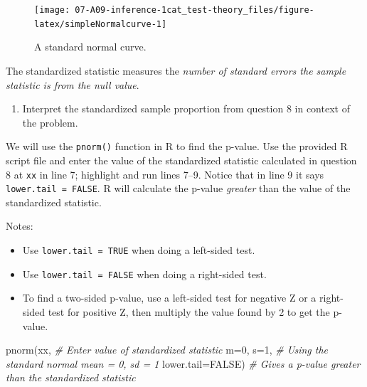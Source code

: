 \documentclass[
]{report}
\newenvironment{Shaded}{\begin{snugshade}}{\end{snugshade}}
\newcommand{\AttributeTok}[1]{\textcolor[rgb]{0.77,0.63,0.00}{#1}}
\newcommand{\CommentTok}[1]{\textcolor[rgb]{0.56,0.35,0.01}{\textit{#1}}}
\newcommand{\ConstantTok}[1]{\textcolor[rgb]{0.00,0.00,0.00}{#1}}
\newcommand{\DecValTok}[1]{\textcolor[rgb]{0.00,0.00,0.81}{#1}}
\newcommand{\FunctionTok}[1]{\textcolor[rgb]{0.00,0.00,0.00}{#1}}
\newcommand{\NormalTok}[1]{#1}
\providecommand{\tightlist}{%
  \setlength{\itemsep}{0pt}\setlength{\parskip}{0pt}}
\begin{document}
\begin{figure}

{\centering \texttt{[image: 07-A09-inference-1cat\_test-theory\_files/figure-latex/simpleNormalcurve-1]} 

}

\caption{A standard normal curve.}\label{fig:simpleNormalcurve}
\end{figure}

\newpage

The standardized statistic measures the \emph{number of standard errors the sample statistic is from the null value}.

\begin{enumerate}
\def\labelenumi{\arabic{enumi}.}
\setcounter{enumi}{9}
\tightlist
\item
  Interpret the standardized sample proportion from question 8 in context of the problem.
\end{enumerate}

\vspace{.8in}

We will use the \texttt{pnorm()} function in R to find the p-value. Use the provided R script file and enter the value of the standardized statistic calculated in question 8 at \texttt{xx} in line 7; highlight and run lines 7--9. Notice that in line 9 it says \texttt{lower.tail\ =\ FALSE}. R will calculate the p-value \emph{greater} than the value of the standardized statistic.

Notes:

\begin{itemize}
\tightlist
\item
  Use \texttt{lower.tail\ =\ TRUE} when doing a left-sided test.
\item
  Use \texttt{lower.tail\ =\ FALSE} when doing a right-sided test.
\item
  To find a two-sided p-value, use a left-sided test for negative Z or a right-sided test for positive Z, then multiply the value found by 2 to get the p-value.
\end{itemize}

\begin{Shaded}
\begin{Highlighting}[]
\FunctionTok{pnorm}\NormalTok{(xx, }\CommentTok{\# Enter value of standardized statistic}
      \AttributeTok{m=}\DecValTok{0}\NormalTok{, }\AttributeTok{s=}\DecValTok{1}\NormalTok{, }\CommentTok{\# Using the standard normal mean = 0, sd = 1}
      \AttributeTok{lower.tail=}\ConstantTok{FALSE}\NormalTok{) }\CommentTok{\# Gives a p{-}value greater than the standardized statistic}
\end{Highlighting}
\end{Shaded}
\end{document}
